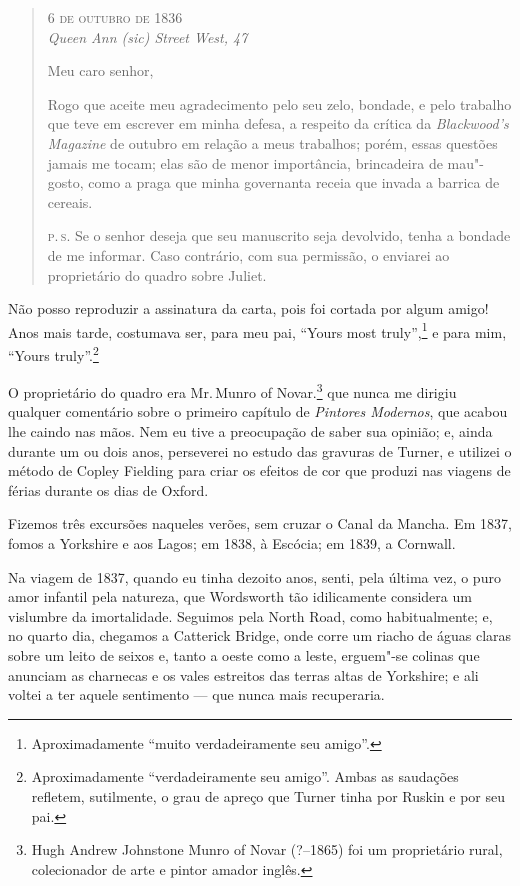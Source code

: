\medskip

\begin{quote}
\begin{flushright}
\smallskip\hfill\textsc{6 de outubro de 1836}\\
\textit{Queen Ann (\textit{sic}) Street West, 47}
\end{flushright}
\bigskip
Meu caro senhor,

Rogo que aceite meu agradecimento pelo seu zelo,
bondade, e pelo trabalho que teve em escrever em minha defesa, a
respeito da crítica da \textit{Blackwood's Magazine} de outubro em relação
a meus trabalhos; porém, essas questões jamais me tocam; elas são de
menor importância, brincadeira de mau"-gosto, como a praga que minha
governanta receia que invada a barrica de cereais.

\textsc{p.\,s.} Se o senhor deseja que seu manuscrito seja devolvido, tenha a
bondade de me informar. Caso contrário, com sua permissão, o enviarei ao
proprietário do quadro sobre Juliet.
\end{quote}

\medskip

Não posso reproduzir a assinatura da carta, pois foi cortada por algum
amigo! Anos mais tarde, costumava ser, para meu pai, ``Yours most
truly'',\footnote{Aproximadamente ``muito verdadeiramente seu amigo''.} e para mim, ``Yours truly''.\footnote{Aproximadamente
  ``verdadeiramente seu amigo''. Ambas as saudações refletem,
  sutilmente, o grau de apreço que Turner tinha por Ruskin e por seu pai.}

O proprietário do quadro era Mr.\,Munro of Novar.\footnote{Hugh Andrew
  Johnstone Munro of Novar (?--1865) foi um proprietário rural, colecionador de
  arte e pintor amador inglês.} que nunca me dirigiu
qualquer comentário sobre o primeiro capítulo de \textit{Pintores Modernos},
que acabou lhe caindo nas mãos. Nem eu tive a preocupação de saber sua
opinião; e, ainda durante um ou dois anos, perseverei no estudo das
gravuras de Turner, e utilizei o método de Copley Fielding para criar os
efeitos de cor que produzi nas viagens de férias durante os dias de
Oxford.

Fizemos três excursões naqueles verões, sem cruzar o Canal da
Mancha. Em 1837, fomos a Yorkshire e aos Lagos; em 1838, à Escócia; em
1839, a Cornwall.

Na viagem de 1837, quando eu tinha dezoito anos, senti, pela última vez,
o puro amor infantil pela natureza, que Wordsworth tão idilicamente
considera um vislumbre da imortalidade. Seguimos pela North Road, como
habitualmente; e, no quarto dia, chegamos a Catterick Bridge, onde corre
um riacho de águas claras sobre um leito de seixos e, tanto a oeste como
a leste, erguem"-se colinas que anunciam as charnecas e os vales
estreitos das terras altas de Yorkshire; e ali voltei a ter aquele
sentimento --- que nunca mais recuperaria.

